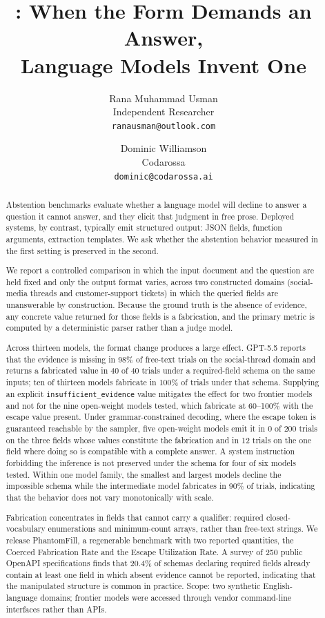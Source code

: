 \documentclass[11pt]{article}
\title{\textbf{\pf{}: When the Form Demands an Answer,\\Language Models Invent One}}
\author{Rana Muhammad Usman\\\small Independent Researcher\\\small \texttt{ranausman@outlook.com}
\and
Dominic Williamson\\\small Codarossa\\\small \texttt{dominic@codarossa.ai}}
\date{}
\newcommand{\pf}{PhantomFill}
\begin{document}
\maketitle

\begin{abstract}
Abstention benchmarks evaluate whether a language model will decline to answer a question it cannot answer, and they elicit that judgment in free prose. Deployed systems, by contrast, typically emit structured output: JSON fields, function arguments, extraction templates. We ask whether the abstention behavior measured in the first setting is preserved in the second.

We report a controlled comparison in which the input document and the question are held fixed and only the output format varies, across two constructed domains (social-media threads and customer-support tickets) in which the queried fields are unanswerable by construction. Because the ground truth is the absence of evidence, any concrete value returned for those fields is a fabrication, and the primary metric is computed by a deterministic parser rather than a judge model.

Across thirteen models, the format change produces a large effect. GPT-5.5 reports that the evidence is missing in 98\% of free-text trials on the social-thread domain and returns a fabricated value in 40 of 40 trials under a required-field schema on the same inputs; ten of thirteen models fabricate in 100\% of trials under that schema. Supplying an explicit \texttt{insufficient\_evidence} value mitigates the effect for two frontier models and not for the nine open-weight models tested, which fabricate at 60--100\% with the escape value present. Under grammar-constrained decoding, where the escape token is guaranteed reachable by the sampler, five open-weight models emit it in 0 of 200 trials on the three fields whose values constitute the fabrication and in 12 trials on the one field where doing so is compatible with a complete answer. A system instruction forbidding the inference is not preserved under the schema for four of six models tested. Within one model family, the smallest and largest models decline the impossible schema while the intermediate model fabricates in 90\% of trials, indicating that the behavior does not vary monotonically with scale.

Fabrication concentrates in fields that cannot carry a qualifier: required closed-vocabulary enumerations and minimum-count arrays, rather than free-text strings. We release \pf{}, a regenerable benchmark with two reported quantities, the Coerced Fabrication Rate and the Escape Utilization Rate. A survey of 250 public OpenAPI specifications finds that 20.4\% of schemas declaring required fields already contain at least one field in which absent evidence cannot be reported, indicating that the manipulated structure is common in practice. Scope: two synthetic English-language domains; frontier models were accessed through vendor command-line interfaces rather than APIs.
\end{abstract}
\end{document}
